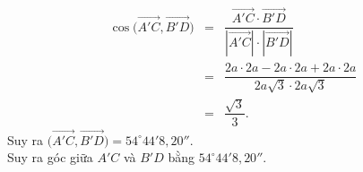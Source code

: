 \begin{bt}
{\begin{enumerate}
\begin{eqnarray*}
				\cos\Big(\overrightarrow{A'C},\overrightarrow{B'D}\Big)&=&\dfrac{\overrightarrow{A'C}\cdot \overrightarrow{B'D}}{\left|\overrightarrow{A'C}\right|\cdot \left|\overrightarrow{B'D}\right|}\\
				&=&\dfrac{2a\cdot 2a-2a\cdot 2a+2a\cdot 2a}{2a\sqrt 3\cdot 2a\sqrt 3}\\
				&=&\dfrac{\sqrt 3}{3}.
			\end{eqnarray*}
			Suy ra $\Big(\overrightarrow{A'C},\overrightarrow{B'D}\Big)=54^\circ44'8{,}20''$.\\
			Suy ra góc giữa $A'C$ và $B'D$ bằng $54^\circ44'8{,}20''$.
		\end{enumerate}
	}
\end{bt}

